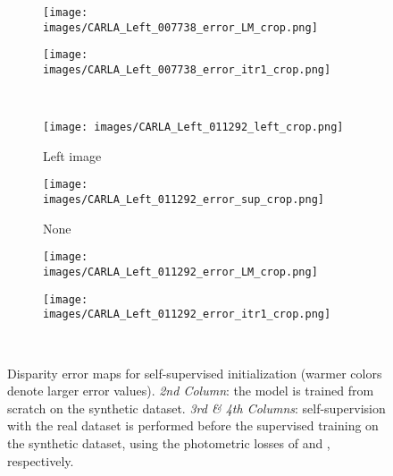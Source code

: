 \documentclass[10pt,twocolumn,letterpaper]{article}
\begin{document}
\begin{figure}[tbp]
	\begin{subfigure}[c]{.242\linewidth}
		\texttt{[image: images/CARLA\_Left\_007738\_error\_LM\_crop.png]}
		\vspace*{-0.38cm}
	\end{subfigure}
	\begin{subfigure}[c]{.242\linewidth}
		\texttt{[image: images/CARLA\_Left\_007738\_error\_itr1\_crop.png]}
		\vspace*{-0.38cm}
	\end{subfigure}	
	\\\begin{subfigure}[c]{.242\linewidth}
		\texttt{[image: images/CARLA\_Left\_011292\_left\_crop.png]}
		\vspace*{-0.45cm}
		\caption{\footnotesize{Left image}}
	\end{subfigure}
	\begin{subfigure}[c]{.242\linewidth}
		\texttt{[image: images/CARLA\_Left\_011292\_error\_sup\_crop.png]}
		\vspace*{-0.45cm}
		\caption{\footnotesize{None}}
	\end{subfigure}
	\begin{subfigure}[c]{.242\linewidth}
		\texttt{[image: images/CARLA\_Left\_011292\_error\_LM\_crop.png]}
		\vspace*{-0.45cm}
		\caption{\footnotesize{}}
	\end{subfigure}
	\begin{subfigure}[c]{.242\linewidth}
		\texttt{[image: images/CARLA\_Left\_011292\_error\_itr1\_crop.png]}
		\vspace*{-0.45cm}
		\caption{\footnotesize{}}
	\end{subfigure}
	\\
	\vspace{-0.3cm}
	\caption{Disparity error maps for self-supervised initialization (warmer colors denote larger error values). \emph{2nd Column}: the model is trained from scratch on the synthetic dataset. \emph{3rd \& 4th Columns}: self-supervision with the real dataset is performed before the supervised training on the synthetic dataset, using the photometric losses of  and , respectively.}
	\label{fig:warpEffect}
\end{figure} 
\end{document}
